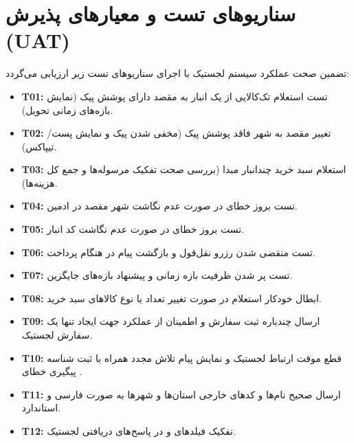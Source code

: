 \documentclass[11pt,a4paper]{article}
\begin{document}
\section{سناریوهای تست و معیارهای پذیرش (UAT)}
تضمین صحت عملکرد سیستم لجستیک با اجرای سناریوهای تست زیر ارزیابی می‌گردد:
\begin{itemize}
    \item \textbf{T01:} تست استعلام تک‌کالایی از یک انبار به مقصد دارای پوشش پیک (نمایش بازه‌های زمانی تحویل).
    \item \textbf{T02:} تغییر مقصد به شهر فاقد پوشش پیک (مخفی شدن پیک و نمایش پست/تیپاکس).
    \item \textbf{T03:} استعلام سبد خرید چندانبار مبدا (بررسی صحت تفکیک مرسوله‌ها و جمع کل هزینه‌ها).
    \item \textbf{T04:} تست بروز خطای  در صورت عدم نگاشت شهر مقصد در ادمین.
    \item \textbf{T05:} تست بروز خطای  در صورت عدم نگاشت کد انبار.
    \item \textbf{T06:} تست منقضی شدن رزرو نقل‌قول و بازگشت پیام  در هنگام پرداخت.
    \item \textbf{T07:} تست پر شدن ظرفیت بازه زمانی و پیشنهاد بازه‌های جایگزین.
    \item \textbf{T08:} ابطال خودکار استعلام در صورت تغییر تعداد یا نوع کالاهای سبد خرید.
    \item \textbf{T09:} ارسال چندباره ثبت سفارش و اطمینان از عملکرد  جهت ایجاد تنها یک سفارش لجستیک.
    \item \textbf{T10:} قطع موقت ارتباط لجستیک و نمایش پیام تلاش مجدد همراه با ثبت شناسه پیگیری خطای .
    \item \textbf{T11:} ارسال صحیح نام‌ها و کدهای خارجی استان‌ها و شهرها به صورت فارسی و استاندارد.
    \item \textbf{T12:} تفکیک فیلدهای  و  در پاسخ‌های دریافتی لجستیک.
\end{itemize}
\end{document}
